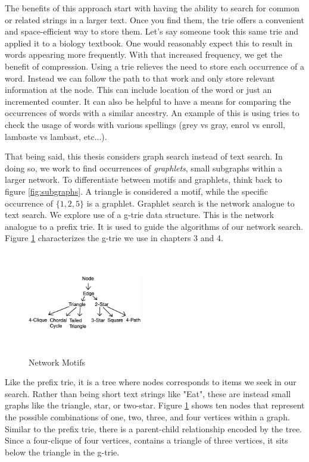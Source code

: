 \documentclass[12pt,twoside]{reedthesis}
\begin{document}
The benefits of this approach start with having the ability to search for common or related strings in a larger text. Once you find them, the trie offers a convenient and space-efficient way to store them. Let's say someone took this same trie and applied it to a biology textbook. One would reasonably expect this to result in words appearing more frequently. With that increased frequency, we get the benefit of compression. Using a trie relieves the need to store each occurrence of a word. Instead we can follow the path to that work and only store relevant information at the node. This can include location of the word or just an incremented counter. It can also be helpful to have a means for comparing the occurrences of words with a similar ancestry. An example of this is using tries to check the usage of words with various spellings (grey vs gray, enrol vs enroll, lambaste vs lambast, etc...).

That being said, this thesis considers graph search instead of text search. In doing so, we work to find occurrences of \textit{graphlets}, small subgraphs within a larger network. To differentiate between motifs and graphlets, think back to figure \ref{fig:subgraphs}. A triangle is considered a motif, while the specific occurrence of $\{1,2,5\}$ is a graphlet. Graphlet search is the network analogue to text search. We explore use of a g-trie data structure. This is the network analogue to a prefix trie. It is used to guide the algorithms of our network search. Figure \ref{fig:motifs} characterizes the g-trie we use in chapters 3 and 4.

\begin{figure}[h]
	\centering
	\includegraphics[width=5cm, height=4.5cm]{motifs_names}
	\caption{Network Motifs}
	\label{fig:motifs}
\end{figure}

Like the prefix trie, it is a tree where nodes corresponds to items we seek in our search. Rather than being short text strings like "Eat", these are instead small graphs like the triangle, star, or two-star. Figure \ref{fig:motifs} shows ten nodes that represent the possible combinations of one, two, three, and four vertices within a graph. Similar to the prefix trie, there is a parent-child relationship encoded by the tree. Since a four-clique of four vertices, contains a triangle of three vertices, it sits below the triangle in the g-trie.
\end{document}
